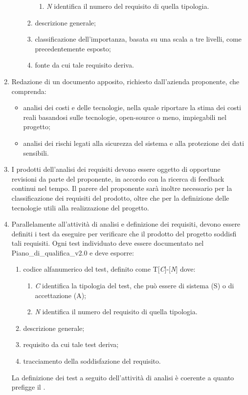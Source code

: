 \begin{enumerate}
\begin{itemize}
\begin{enumerate}
\begin{enumerate}
            \item \textit{N} identifica il numero del requisito di quella tipologia.
        \end{enumerate}
        \item descrizione generale;
        \item classificazione dell'importanza, basata su una scala a tre livelli, come precedentemente esposto;
        \item fonte da cui tale requisito deriva.
    \end{enumerate}
    \end{itemize}
    \item Redazione di un documento apposito, richiesto dall'azienda proponente, che comprenda:
    \begin{itemize}
    \item analisi dei costi e delle tecnologie, nella quale riportare la stima dei costi reali basandosi sulle tecnologie, open-source o meno, impiegabili nel progetto;
    \item analisi dei rischi legati alla sicurezza del sistema e alla protezione dei dati sensibili.
    \end{itemize}
    \item I prodotti dell'analisi dei requisiti devono essere oggetto di opportune revisioni da parte del proponente, in accordo con la ricerca di feedback continui nel tempo. Il parere del proponente sarà inoltre necessario per la classificazione dei requisiti del prodotto, oltre che per la definizione delle tecnologie utili alla realizzazione del progetto.
    \item Parallelamente all'attività di analisi e definizione dei requisiti, devono essere definiti i test da eseguire per verificare che il prodotto del progetto soddisfi tali requisiti. Ogni test individuato deve essere documentato nel Piano\_di\_qualifica\_v2.0 e deve esporre:
    \begin{enumerate}
        \item codice alfanumerico del test, definito come T[\textit{C}]-[\textit{N}] dove:
        \begin{enumerate}
            \item \textit{C} identifica la tipologia del test, che può essere di sistema (S) o di accettazione (A);
            \item \textit{N} identifica il numero del requisito di quella tipologia.
        \end{enumerate}
        \item descrizione generale;
        \item requisito da cui tale test deriva;
        \item tracciamento della soddisfazione del requisito.
    \end{enumerate}
    La definizione dei test a seguito dell'attività di analisi è coerente a quanto prefigge il .
\end{enumerate}

